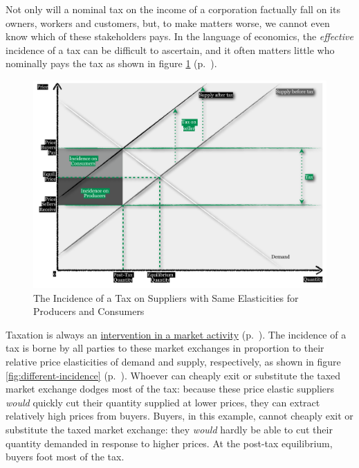 Not only will a nominal tax on the income of a corporation factually fall on its owners, workers and customers, but, to make matters worse, we cannot even know which of these stakeholders pays. In the language of economics, the \emph{effective} incidence of a tax can be difficult to ascertain, and it often matters little who nominally pays the tax as shown in figure \ref{fig:same-incidence} (p.~\pageref{fig:same-incidence}). 

 \begin{figure}[htbp]
	\centering
	\includegraphics[width=1\textwidth]{./img/same-incidence}  
	\caption[Incidence of a Tax on Suppliers with Unit-Elastic Supply and Demand]{The Incidence of a Tax on Suppliers with Same Elasticities for Producers and Consumers}
	\label{fig:same-incidence}
\end{figure}

Taxation is always an \hyperref[sec:marketvscommand]{intervention in a market activity} (p.~\pageref{sec:marketvscommand}). The incidence of a tax is borne by all parties to these market exchanges in proportion to their relative price elasticities of demand and supply, respectively, as shown in figure \ref{fig:different-incidence} (p.~\pageref{fig:different-incidence}). Whoever can cheaply exit or substitute the taxed market exchange dodges most of the tax: because these price elastic suppliers \emph{would} quickly cut their quantity supplied at lower prices, they can extract relatively high prices from buyers. Buyers, in this example, cannot cheaply exit or substitute the taxed market exchange: they \emph{would} hardly be able to cut their quantity demanded in response to higher prices. At the post-tax equilibrium, buyers foot most of the tax.

